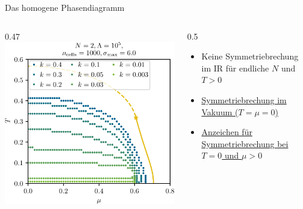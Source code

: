 \documentclass[10pt]{beamer}
\begin{document}
\begin{frame}{Das homogene Phasendiagramm}
	\hypersetup{linkcolor=goetheBlauDarker} 
	\begin{columns}
		\begin{column}{0.47\framewidth}
			\centering
			\includegraphics[width=0.47\framewidth]{../gn/figures/phase_boundaries.pdf}
		\end{column}\hspace{.1cm}
		\begin{column}{0.5\framewidth}
			\begin{itemize}
				\item Keine Symmetriebrechung im IR für endliche $N$ und $T>0$
				\item \hyperlink{2dvac}{Symmetriebrechung im Vakuum ($T=\mu=0$)}
				\item \hyperlink{2dqpt}{Anzeichen für Symmetriebrechung bei $T=0$ und $\mu>0$}
			\end{itemize}
		\end{column}
	\end{columns}

	

\end{frame}
\end{document}
